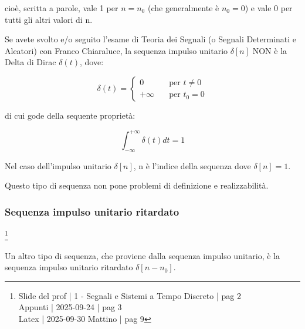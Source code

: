 cioè, scritta a parole, vale 1 per $n = n_0$ (che generalmente è $n_0 = 0$) e vale 0 per tutti gli altri valori di n. \newline 

\begin{tcolorbox}
    Se avete svolto e/o seguito l'esame di Teoria dei Segnali (o Segnali Determinati e Aleatori) con Franco Chiaraluce, 
    la sequenza impulso unitario $\delta [n]$ NON è la Delta di Dirac $\delta (t)$, dove: 
    
    {
        \Large 
        \begin{equation}
            \delta (t)
            = 
            \begin{cases}
                0 \quad &\text{per } t \neq 0
                \\
                + \infty \quad &\text{per } t_0 = 0
            \end{cases}
        \end{equation}
    }

    di cui gode della sequente proprietà: 

    {
        \Large 
        \begin{equation}
            \int_{- \infty}^{+\infty} \delta (t) dt = 1
        \end{equation}
    }

    Nel caso dell'impulso unitario $\delta \left[ n\right]$, n è l'indice della sequenza dove $\delta \left[ n\right] = 1$. 

\end{tcolorbox}

Questo tipo di sequenza non pone problemi di definizione e realizzabilità. \newline 

\newpage 

\subsubsection{Sequenza impulso unitario ritardato}

\footnote{ 
    Slide del prof | 1 - Segnali e Sistemi a Tempo Discreto | pag 2 \\
    Appunti | 2025-09-24 | pag 3 \\ 
    Latex | 2025-09-30 Mattino | pag 9
}

Un altro tipo di sequenza, che proviene dalla sequenza impulso unitario, 
è la sequenza impulso unitario ritardato $\delta \left[n - n_0\right]$. \newline 

